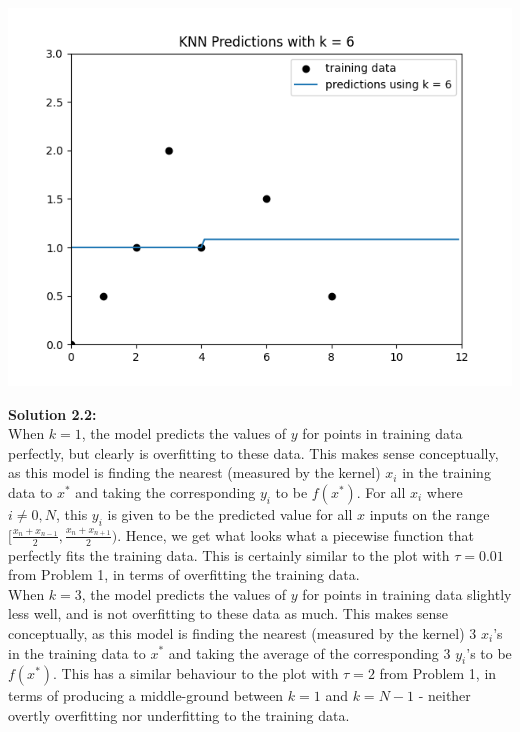 \documentclass[submit]{harvardml}
\begin{document}
\begin{center}
    \includegraphics[scale=0.5]{k6.png}
\end{center}
\newpage

\noindent\textbf{Solution 2.2:}\\
When $k = 1$, the model predicts the values of $y$ for points in training data perfectly, but clearly is overfitting to these data. This makes sense conceptually, as this model is finding the nearest (measured by the kernel) $x_i$ in the training data to $x^*$ and taking the corresponding $y_i$ to be $f(x^*)$. For all $x_i$ where $i \ne 0, N$, this $y_i$ is given to be the predicted value for all $x$ inputs on the range $[\frac{x_{n} + x_{n-1}}{2}, \frac{x_{n} + x_{n+1}}{2})$. Hence, we get what looks what a piecewise function that perfectly fits the training data. This is certainly similar to the plot with $\tau = 0.01$ from Problem 1, in terms of overfitting the training data.\\

\noindent When $k = 3$, the model predicts the values of $y$ for points in training data slightly less well, and is not overfitting to these data as much. This makes sense conceptually, as this model is finding the nearest (measured by the kernel) 3 $x_i$'s in the training data to $x^*$ and taking the average of the corresponding 3 $y_i$'s to be $f(x^*)$. This has a similar behaviour to the plot with $\tau = 2$ from Problem 1, in terms of producing a middle-ground between $k=1$ and $k=N-1$ - neither overtly overfitting nor underfitting to the training data.\\
\end{document}
